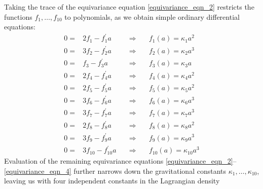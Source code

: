 Taking the trace of the equivariance equation \eqref{equivariance_eqn_2} restricts the functions $f_1,\dots, f_{10}$ to polynomials, as we obtain simple ordinary differential equations:
\begin{equation}\label{cosmo_ansaetze}
  \begin{aligned}
    0 = {} & 2 f_1 - f_1^\prime a \quad & \Rightarrow & \quad f_1(a) = \kappa_1 a^2 \\
    0 = {} & 3 f_2 - f_2^\prime a \quad & \Rightarrow & \quad f_2(a) = \kappa_2 a^3 \\
    0 = {} & f_3 - f_3^\prime a \quad & \Rightarrow & \quad f_3(a) = \kappa_3 a \\
    0 = {} & 2 f_4 - f_4^\prime a \quad & \Rightarrow & \quad f_4(a) = \kappa_4 a^2 \\
    0 = {} & 2 f_5 - f_5^\prime a \quad & \Rightarrow & \quad f_5(a) = \kappa_5 a^2 \\
    0 = {} & 3 f_6 - f_6^\prime a \quad & \Rightarrow & \quad f_6(a) = \kappa_6 a^3 \\
    0 = {} & 3 f_7 - f_7^\prime a \quad & \Rightarrow & \quad f_7(a) = \kappa_7 a^3 \\
    0 = {} & 2 f_8 - f_8^\prime a \quad & \Rightarrow & \quad f_8(a) = \kappa_8 a^2 \\
    0 = {} & 3 f_9 - f_9^\prime a \quad & \Rightarrow & \quad f_9(a) = \kappa_9 a^3 \\
    0 = {} & 3 f_{10} - f_{10}^\prime a \quad & \Rightarrow & \quad f_{10}(a) = \kappa_{10} a^3
  \end{aligned}
\end{equation}
Evaluation of the remaining equivariance equations \eqref{equivariance_eqn_2}--\eqref{equivariance_eqn_4} further narrows down the gravitational constants $\kappa_1,\dots,\kappa_{10}$, leaving us with four independent constants in the Lagrangian density
